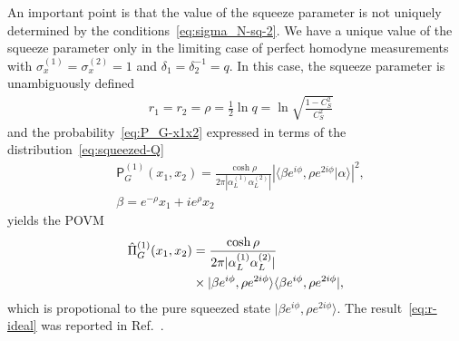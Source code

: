 \documentclass[%
reprint,
superscriptaddress,
 amsmath,amssymb,amsfonts,
 aps,
 pra,
 longbibliography
]{revtex4-2}
\newcommand{\ket}[1]{\ensuremath{|{#1}\rangle}}
\newcommand{\bra}[1]{\ensuremath{\langle{#1}|}}
\newcommand{\avr}[1]{\ensuremath{\langle{#1}\rangle}}
\newcommand{\prob}{\mathsf{P}}
\begin{document}
An important point is that
the value of the squeeze parameter
is not uniquely determined
by the conditions~\eqref{eq:sigma_N-sq-2}.
We have a unique value of
the squeeze parameter only in  the limiting case
of perfect homodyne measurements
with $\sigma_{x}^{(1)}=\sigma_{x}^{(2)}=1$
and $\delta_{1}=\delta_{2}^{-1}=q$.
In this case, the squeeze parameter is
unambiguously defined
\begin{align}
  &
  \label{eq:r-ideal}
  r_1=r_2=\rho=\frac{1}{2}\ln q=\ln\sqrt{\frac{1-C_S^2}{C_S^2}}
\end{align}
and the probability~\eqref{eq:P_G-x1x2}
expressed in terms of the distribution~\eqref{eq:squeezed-Q}
\begin{align}
  &
    \label{eq:P_G-ideal}
  \prob_{G}^{(1)}(x_1,x_2)=\frac{\cosh \rho}{2\pi |\alpha_L^{(1)}\alpha_L^{(2)}|}
    |\avr{\beta e^{i\phi},\rho e^{2i\phi}|\alpha}|^2,
  \\
  &
    \label{eq:beta-ideal}
    \beta=e^{-\rho}x_1+i e^{\rho} x_2
\end{align}
yields the POVM
\begin{align}
    \label{eq:Pi_G-ideal}
    \hat{\Pi}_{G}^{(1)}(x_1,x_2)&=\frac{\cosh \rho}{2\pi |\alpha_L^{(1)}\alpha_L^{(2)}|}
    \notag
  \\
  &
  \times
    \ket{\beta e^{i\phi},\rho e^{2i\phi}}\bra{\beta e^{i\phi},\rho e^{2i\phi}},
\end{align}
which is propotional to the pure squeezed state
$\ket{\beta e^{i\phi},\rho e^{2i\phi}}$.
The result~\eqref{eq:r-ideal}
was reported in Ref.~\cite{genoni2014general}.
\end{document}
